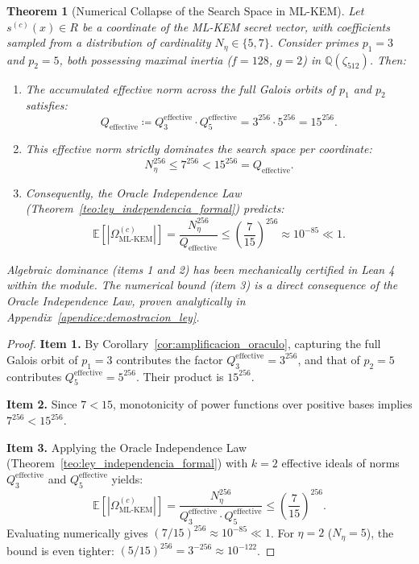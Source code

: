 \documentclass[11pt,a4paper]{article}
\theoremstyle{plain}
\newtheorem{teorema}{Theorem}[section]
\theoremstyle{definition}
\numberwithin{equation}{section}
\newcommand{\QQ}{\mathbb{Q}}
\newcommand{\E}{\mathbb{E}}
\begin{document}
\begin{teorema}[Numerical Collapse of the Search Space in ML-KEM]
\label{teo:unicidad_mlkem}
Let $s^{(c)}(x) \in R$ be a coordinate of the ML-KEM secret vector, with coefficients sampled from a distribution of cardinality $N_\eta \in \{5, 7\}$. Consider primes $p_1 = 3$ and $p_2 = 5$, both possessing maximal inertia ($f = 128$, $g = 2$) in $\QQ(\zeta_{512})$. Then:
\begin{enumerate}
    \item The accumulated effective norm across the full Galois orbits of $p_1$ and $p_2$ satisfies:
    \begin{equation}
    Q_{\text{effective}} \coloneqq Q_3^{\text{effective}} \cdot Q_5^{\text{effective}} = 3^{256} \cdot 5^{256} = 15^{256}.
    \end{equation}
    \item This effective norm strictly dominates the search space per coordinate:
    \begin{equation}
    N_\eta^{256} \le 7^{256} < 15^{256} = Q_{\text{effective}}.
    \end{equation}
    \item Consequently, the Oracle Independence Law (Theorem~\ref{teo:ley_independencia_formal}) predicts:
    \begin{equation}
    \E[|\Omega_{\text{ML-KEM}}^{(c)}|] = \frac{N_\eta^{256}}{Q_{\text{effective}}} \le \left(\frac{7}{15}\right)^{256} \approx 10^{-85} \ll 1.
    \end{equation}
\end{enumerate}
Algebraic dominance (items 1 and 2) has been mechanically certified in Lean 4 within the  module. The numerical bound (item 3) is a direct consequence of the Oracle Independence Law, proven analytically in Appendix~\ref{apendice:demostracion_ley}.
\end{teorema}

\begin{proof}
\textbf{Item 1.} By Corollary~\ref{cor:amplificacion_oraculo}, capturing the full Galois orbit of $p_1 = 3$ contributes the factor $Q_3^{\text{effective}} = 3^{256}$, and that of $p_2 = 5$ contributes $Q_5^{\text{effective}} = 5^{256}$. Their product is $15^{256}$.

\textbf{Item 2.} Since $7 < 15$, monotonicity of power functions over positive bases implies $7^{256} < 15^{256}$.

\textbf{Item 3.} Applying the Oracle Independence Law (Theorem~\ref{teo:ley_independencia_formal}) with $k=2$ effective ideals of norms $Q_3^{\text{effective}}$ and $Q_5^{\text{effective}}$ yields:
\begin{equation}
\E[|\Omega_{\text{ML-KEM}}^{(c)}|] = \frac{N_\eta^{256}}{Q_3^{\text{effective}} \cdot Q_5^{\text{effective}}} \le \left(\frac{7}{15}\right)^{256}.
\end{equation}
Evaluating numerically gives $(7/15)^{256} \approx 10^{-85} \ll 1$. For $\eta = 2$ ($N_\eta = 5$), the bound is even tighter: $(5/15)^{256} = 3^{-256} \approx 10^{-122}$.
\end{proof}
\end{document}
